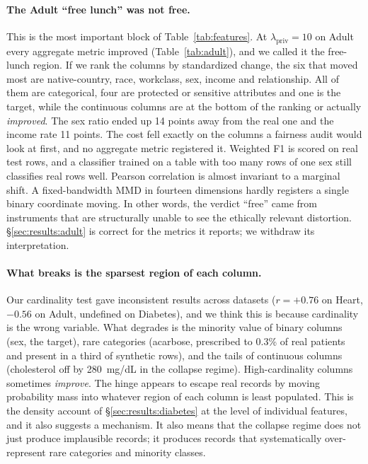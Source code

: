 \documentclass[11pt,a4paper]{article}
\newcommand{\lpriv}{\lambda_{\text{priv}}}
\begin{document}
\paragraph{The Adult ``free lunch'' was not free.}
This is the most important block of Table~\ref{tab:features}. At
$\lpriv = 10$ on Adult every aggregate metric improved
(Table~\ref{tab:adult}), and we called it the free-lunch region. If we rank
the columns by standardized change, the six that moved most are
native-country, race, workclass, sex, income and relationship. All of them are
categorical, four are protected or sensitive attributes and one is the target,
while the continuous columns are at the bottom of the ranking or actually
\emph{improved}. The sex ratio ended up 14 points away from the real one and
the income rate 11 points. The cost fell exactly on the columns a fairness
audit would look at first, and no aggregate metric registered it. Weighted F1
is scored on real test rows, and a classifier trained on a table with too many
rows of one sex still classifies real rows well. Pearson correlation is
almost invariant to a marginal shift. A fixed-bandwidth MMD in fourteen
dimensions hardly registers a single binary coordinate moving. In other words,
the verdict ``free'' came from instruments that are structurally unable to see
the ethically relevant distortion. \S\ref{sec:results:adult} is correct for
the metrics it reports; we withdraw its interpretation.

\paragraph{What breaks is the sparsest region of each column.}
Our cardinality test gave inconsistent results across datasets ($r = +0.76$
on Heart, $-0.56$ on Adult, undefined on Diabetes), and we think this is
because cardinality is the wrong variable. What degrades is the minority value
of binary columns (sex, the target), rare categories (acarbose, prescribed to
0.3\% of real patients and present in a third of synthetic rows), and the
tails of continuous columns (cholesterol off by 280~mg/dL in the collapse
regime). High-cardinality columns sometimes \emph{improve}. The hinge appears
to escape real records by moving probability mass into whatever region of each
column is least populated. This is the density account of
\S\ref{sec:results:diabetes} at the level of individual features, and it also
suggests a mechanism. It also means that the collapse regime does not just
produce implausible records; it produces records that systematically
over-represent rare categories and minority classes.
\end{document}
